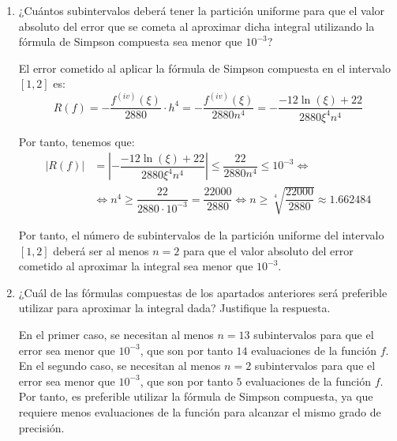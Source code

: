 \begin{ejercicio}
\begin{enumerate}
        \item ¿Cuántos subintervalos deberá tener la partición uniforme para que el valor absoluto del error que se cometa al aproximar dicha integral utilizando la fórmula de Simpson compuesta sea menor que $10^{-3}$?
        
        El error cometido al aplicar la fórmula de Simpson compuesta en el intervalo $[1, 2]$ es:
        \begin{equation*}
            R(f) = -\dfrac{f^{(iv)}(\xi)}{2880} \cdot h^4
            = -\dfrac{f^{(iv)}(\xi)}{2880n^4}
            = -\dfrac{-12\ln(\xi) + 22}{2880\xi^4n^4}
        \end{equation*}

        Por tanto, tenemos que:
        \begin{align*}
            |R(f)| &= \left| -\dfrac{-12\ln(\xi) + 22}{2880\xi^4n^4} \right| \leq \dfrac{22}{2880n^4}\leq 10^{-3}\iff \\&\iff n^4 \geq \dfrac{22}{2880\cdot 10^{-3}} = \dfrac{22000}{2880} \iff n \geq \sqrt[4]{\dfrac{22000}{2880}} \approx 1.662484
        \end{align*}

        Por tanto, el número de subintervalos de la partición uniforme del intervalo $[1, 2]$ deberá ser al menos $n = 2$ para que el valor absoluto del error cometido al aproximar la integral sea menor que $10^{-3}$.
        \item ¿Cuál de las fórmulas compuestas de los apartados anteriores será preferible utilizar para aproximar la integral dada? Justifique la respuesta.
        
        En el primer caso, se necesitan al menos $n = 13$ subintervalos para que el error sea menor que $10^{-3}$, que son por tanto $14$ evaluaciones de la función $f$. En el segundo caso, se necesitan al menos $n = 2$ subintervalos para que el error sea menor que $10^{-3}$, que son por tanto $5$ evaluaciones de la función $f$. Por tanto, es preferible utilizar la fórmula de Simpson compuesta, ya que requiere menos evaluaciones de la función para alcanzar el mismo grado de precisión.
    \end{enumerate}
\end{ejercicio}


